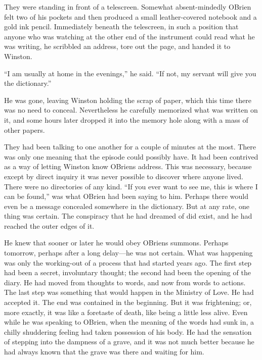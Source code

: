 They were standing in front of a telescreen. Somewhat absent-mindedly
O\textquotesingle Brien felt two of his pockets and then produced a
small leather-covered notebook and a gold ink pencil. Immediately
beneath the telescreen, in such a position that anyone who was watching
at the other end of the instrument could read what he was writing, he
scribbled an address, tore out the page, and handed it to Winston.

``I am usually at home in the evenings,'' he said. ``If not, my servant
will give you the dictionary.''

He was gone, leaving Winston holding the scrap of paper, which this time
there was no need to conceal. Nevertheless he carefully memorized what
was written on it, and some hours later dropped it into the memory hole
along with a mass of other papers.

They had been talking to one another for a couple of minutes at the
most. There was only one meaning that the episode could possibly have.
It had been contrived as a way of letting Winston know
O\textquotesingle Brien\textquotesingle s address. This was necessary,
because except by direct inquiry it was never possible to discover where
anyone lived. There were no directories of any kind. ``If you ever want
to see me, this is where I can be found,'' was what
O\textquotesingle Brien had been saying to him. Perhaps there would even
be a message concealed somewhere in the dictionary. But at any rate, one
thing was certain. The conspiracy that he had dreamed of did exist, and
he had reached the outer edges of it.

He knew that sooner or later he would obey
O\textquotesingle Brien\textquotesingle s summons. Perhaps tomorrow,
perhaps after a long delay---he was not certain. What was happening was
only the working-out of a process that had started years ago. The first
step had been a secret, involuntary thought; the second had been the
opening of the diary. He had moved from thoughts to words, and now from
words to actions. The last step was something that would happen in the
Ministry of Love. He had accepted it. The end was contained in the
beginning. But it was frightening; or, more exactly, it was like a
foretaste of death, like being a little less alive. Even while he was
speaking to O\textquotesingle Brien, when the meaning of the words had
sunk in, a chilly shuddering feeling had taken possession of his body.
He had the sensation of stepping into the dampness of a grave, and it
was not much better because he had always known that the grave was there
and waiting for him.


